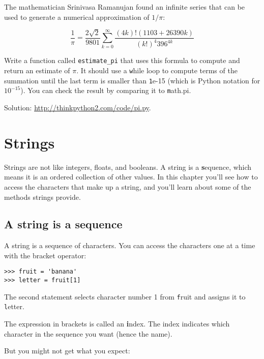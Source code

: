 \documentclass[
DIV=11,
fontsize=13,
twoside,
headinclude=false,
titlepage=firstiscover,
abstract=true,
headsepline=true,
footsepline=true,
chapterprefix=true, %
headings=big,
bibliography=totoc,%
captions=tableheading
]{scrbook}
\theoremstyle{definition}
\begin{document}
\begin{exercise}
\normalfont
{}

The mathematician Srinivasa Ramanujan found an
infinite series
that can be used to generate a numerical
approximation of $1 / \pi$:

\[ \frac{1}{\pi} = \frac{2\sqrt{2}}{9801} 
\sum^\infty_{k=0} \frac{(4k)!(1103+26390k)}{(k!)^4 396^{4k}} \]

Write a function called \verb"estimate_pi" that uses this formula
to compute and return an estimate of $\pi$.  It should use a {\texttt while}
loop to compute terms of the summation until the last term is
smaller than {\texttt 1e-15} (which is Python notation for $10^{-15}$).
You can check the result by comparing it to {\texttt math.pi}.

Solution: \url{http://thinkpython2.com/code/pi.py}.

\end{exercise}


\chapter{Strings}
\label{strings}

Strings are not like integers, floats, and booleans.  A string
is a {\textbf sequence}, which means it is
an ordered collection of other values.  In this chapter you'll see
how to access the characters that make up a string, and you'll
learn about some of the methods strings provide.


\section{A string is a sequence}

A string is a sequence of characters.  
You can access the characters one at a time with the
bracket operator:

\begin{lstlisting}
>>> fruit = 'banana'
>>> letter = fruit[1]
\end{lstlisting}
%
The second statement selects character number 1 from {\texttt
fruit} and assigns it to {\texttt letter}.  

The expression in brackets is called an {\textbf index}.  
The index indicates which character in the sequence you
want (hence the name).

But you might not get what you expect:
\end{document}
